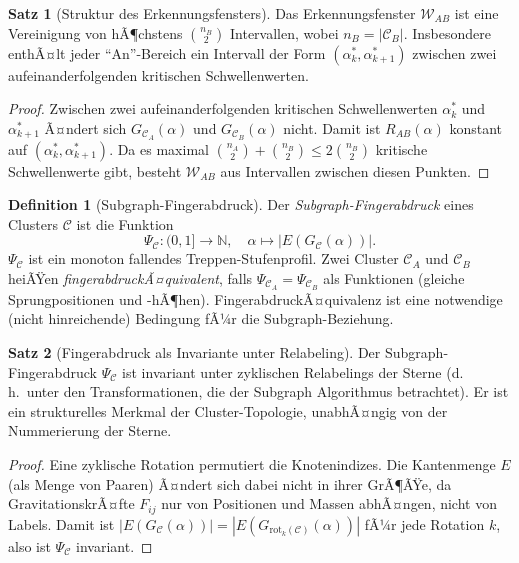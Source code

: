 ﻿\documentclass[a4paper,12pt]{report}
\theoremstyle{definition}
\newtheorem{definition}{Definition}
\newtheorem{satz}{Satz}
\begin{document}
\begin{satz}[Struktur des Erkennungsfensters]
\label{satz:fensterstruktur}
Das Erkennungsfenster $\mathcal{W}_{AB}$ ist eine Vereinigung von hÃ¶chstens $\binom{n_B}{2}$ Intervallen, wobei $n_B = |\mathcal{C}_B|$. Insbesondere enthÃ¤lt jeder ``An''-Bereich ein Intervall der Form $(\alpha^*_k, \alpha^*_{k+1})$ zwischen zwei aufeinanderfolgenden kritischen Schwellenwerten.
\end{satz}

\begin{proof}
Zwischen zwei aufeinanderfolgenden kritischen Schwellenwerten $\alpha^*_k$ und $\alpha^*_{k+1}$ Ã¤ndert sich $G_{\mathcal{C}_A}(\alpha)$ und $G_{\mathcal{C}_B}(\alpha)$ nicht. Damit ist $R_{AB}(\alpha)$ konstant auf $(\alpha^*_k, \alpha^*_{k+1})$. Da es maximal $\binom{n_A}{2} + \binom{n_B}{2} \leq 2\binom{n_B}{2}$ kritische Schwellenwerte gibt, besteht $\mathcal{W}_{AB}$ aus Intervallen zwischen diesen Punkten.
\end{proof}

\begin{definition}[Subgraph-Fingerabdruck]
\label{def:fingerabdruck}
Der \emph{Subgraph-Fingerabdruck} eines Clusters $\mathcal{C}$ ist die Funktion
\[
\Psi_\mathcal{C}: (0,1] \to \mathbb{N}, \quad \alpha \mapsto |E(G_\mathcal{C}(\alpha))|.
\]
$\Psi_\mathcal{C}$ ist ein monoton fallendes Treppen-Stufenprofil. Zwei Cluster $\mathcal{C}_A$ und $\mathcal{C}_B$ heiÃŸen \emph{fingerabdruckÃ¤quivalent}, falls $\Psi_{\mathcal{C}_A} = \Psi_{\mathcal{C}_B}$ als Funktionen (gleiche Sprungpositionen und -hÃ¶hen). FingerabdruckÃ¤quivalenz ist eine notwendige (nicht hinreichende) Bedingung fÃ¼r die Subgraph-Beziehung.
\end{definition}

\begin{satz}[Fingerabdruck als Invariante unter Relabeling]
\label{satz:fingerabdruck_invariant}
Der Subgraph-Fingerabdruck $\Psi_\mathcal{C}$ ist invariant unter zyklischen Relabelings der Sterne (d.\,h.\ unter den Transformationen, die der Subgraph Algorithmus betrachtet). Er ist ein strukturelles Merkmal der Cluster-Topologie, unabhÃ¤ngig von der Nummerierung der Sterne.
\end{satz}

\begin{proof}
Eine zyklische Rotation permutiert die Knotenindizes. Die Kantenmenge $E$ (als Menge von Paaren) Ã¤ndert sich dabei nicht in ihrer GrÃ¶ÃŸe, da Gravitations\-krÃ¤fte $F_{ij}$ nur von Positionen und Massen abhÃ¤ngen, nicht von Labels. Damit ist $|E(G_\mathcal{C}(\alpha))| = |E(G_{\mathrm{rot}_k(\mathcal{C})}(\alpha))|$ fÃ¼r jede Rotation $k$, also ist $\Psi_\mathcal{C}$ invariant.
\end{proof}
\end{document}
